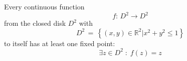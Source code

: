 \documentclass[aspectratio=169]{beamer}
\begin{document}
\begin{wallpaperframe}
Every continuous function
\[
    f:\,D^2 \rightarrow D^2
\]
from the closed disk \(D^2\) with 
\[ 
    D^2 \, = \, \left\{\left(x,y\right) \in \mathbb{R}^2 | x^2 + y^2 \leq 1\right\} 
\] 
to itself has at least one fixed point:
\[
    \exists z \in D^2 \; : \; f(z) = z
\]
\end{wallpaperframe}
\end{document}
